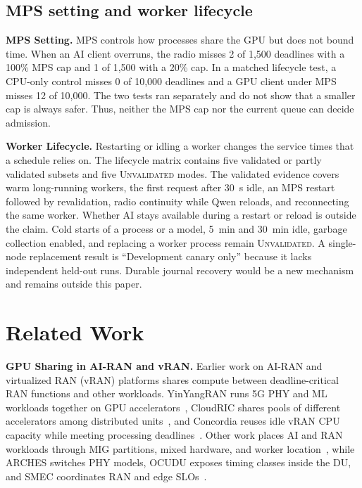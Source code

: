 \documentclass[acmsmall,screen,review,anonymous]{acmart}
\newcommand{\UQ}{\textsc{Unvalidated}\xspace}
\begin{document}
\subsection{MPS setting and worker lifecycle}
\label{sec:eval-sensitivity}

\noindent\textbf{MPS Setting.}
MPS controls how processes share the GPU but does not bound time. When an AI client overruns, the radio
misses 2 of 1,500 deadlines with a 100\% MPS cap and 1 of 1,500 with a 20\% cap. In a matched lifecycle
test, a CPU-only control misses 0 of 10,000 deadlines and a GPU client under MPS misses 12 of 10,000. The
two tests ran separately and do not show that a smaller cap is always safer. Thus, neither the MPS cap nor
the current queue can decide admission.

\noindent\textbf{Worker Lifecycle.}
Restarting or idling a worker changes the service times that a schedule relies on. The lifecycle matrix
contains five validated or partly validated subsets and five \UQ modes. The validated evidence covers warm
long-running workers, the first request after 30~s idle, an MPS restart followed by revalidation, radio
continuity while Qwen reloads, and reconnecting the same worker. Whether AI stays available during a
restart or reload is outside the claim. Cold starts of a process or a model, 5~min and 30~min idle, garbage
collection enabled, and replacing a worker process remain \UQ. A single-node replacement result is
``Development canary only'' because it lacks independent held-out runs.
Durable journal recovery would be a new mechanism and remains outside this paper.

\section{Related Work}
\label{sec:related}

\noindent\textbf{GPU Sharing in AI-RAN and vRAN.}
Earlier work on AI-RAN and virtualized RAN (vRAN) platforms shares compute between deadline-critical RAN
functions and other workloads. YinYangRAN runs 5G PHY and ML workloads together on GPU
accelerators~\cite{yinyangran}, CloudRIC shares pools of different accelerators among distributed
units~\cite{cloudric}, and Concordia reuses idle vRAN CPU capacity while meeting processing
deadlines~\cite{concordia}. Other work places AI and RAN workloads through MIG partitions, mixed hardware,
and worker location~\cite{interplay,caora,haf,distributedairan}, while ARCHES switches PHY models, OCUDU
exposes timing classes inside the DU, and SMEC coordinates RAN and edge SLOs~\cite{arches,ocudu,smec}.
\end{document}
